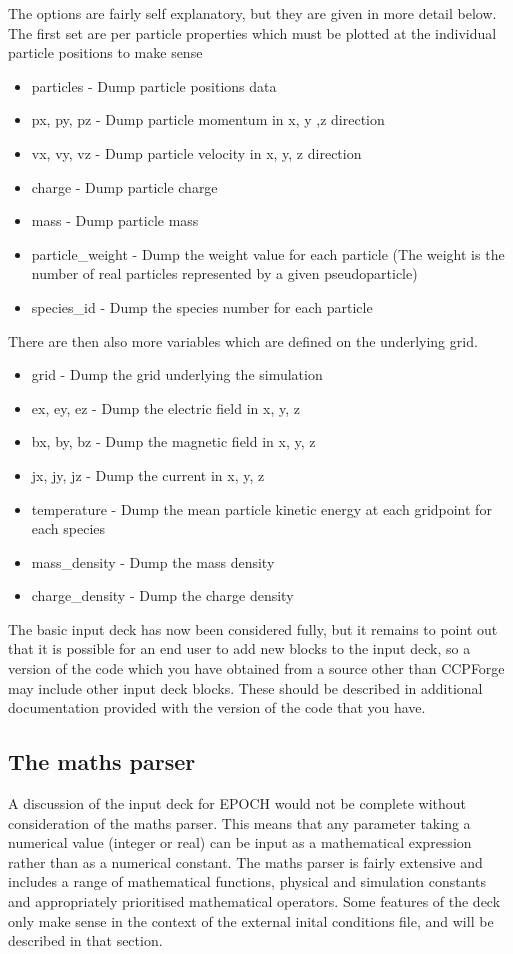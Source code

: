 \documentclass[12pt]{article}
\begin{document}
The options are fairly self explanatory, but they are given in more detail below. The first set are per particle properties which must be plotted at the individual particle positions to make sense\\
\begin{itemize}
\item particles - Dump particle positions data
\item px, py, pz - Dump particle momentum in x, y ,z direction
\item vx, vy, vz - Dump particle velocity in x, y, z direction
\item charge - Dump particle charge
\item mass - Dump particle mass
\item particle\_weight - Dump the weight value for each particle (The weight is the number of real particles represented by a given pseudoparticle)
\item species\_id - Dump the species number for each particle
\end{itemize}
There are then also more variables which are defined on the underlying grid.\\
\begin{itemize}
\item grid - Dump the grid underlying the simulation
\item ex, ey, ez - Dump the electric field in x, y, z
\item bx, by, bz - Dump the magnetic field in x, y, z
\item jx, jy, jz - Dump the current in x, y, z
\item temperature - Dump the mean particle kinetic energy at each gridpoint for each species
\item mass\_density - Dump the mass density
\item charge\_density - Dump the charge density
\end{itemize}

The basic input deck has now been considered fully, but it remains to point out that it is possible for an end user to add new blocks to the input deck, so a version of the code which you have obtained from a source other than CCPForge may include other input deck blocks. These should be described in additional documentation provided with the version of the code that you have.

\subsection{The maths parser}
A discussion of the input deck for EPOCH would not be complete without consideration of the maths parser. This means that any parameter taking a numerical value (integer or real) can be input as a mathematical expression rather than as a numerical constant. The maths parser is fairly extensive and includes a range of mathematical functions, physical and simulation constants and appropriately prioritised mathematical operators. Some features of the deck only make sense in the context of the external inital conditions file, and will be described in that section.
\end{document}
